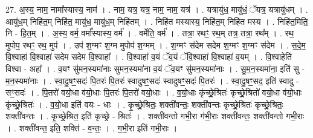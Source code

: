 \documentclass[17pt]{extarticle}
\begin{document}
27. अ॒स्य॒ नाम॒ नामा᳚स्यास्य॒ नाम॑ । . नाम॒ यत्र॒ यत्र॒ नाम॒ नाम॒ यत्र॑ । . यत्रायु॑ध॒ मायु॑धं॒ ॅयत्र॒ यत्रायु॑धम् । . आयु॑ध॒म् निहि॑त॒म् निहि॑त॒ मायु॑ध॒ मायु॑ध॒म् निहि॑तम् । . निहि॑त मस्यास्य॒ निहि॑त॒म् निहि॑त मस्य । . निहि॑त॒मिति॒ नि - हि॒त॒म् । . अ॒स्य॒ वर्म॒ वर्मा᳚स्यास्य॒ वर्म॑ । . वर्मेति॒ वर्म॑ । . तत्रा॒ रथꣳ॒॒ रथ॒म् तत्र॒ तत्रा॒ रथ᳚म् । . रथ॒ मुपोप॒ रथꣳ॒॒ रथ॒ मुप॑ । . उप॑ श॒ग्मꣳ श॒ग्म मुपोप॑ श॒ग्मम् । . श॒ग्मꣳ स॑देम सदेम श॒ग्मꣳ श॒ग्मꣳ स॑देम । . स॒दे॒म॒ वि॒श्वाहा॑ वि॒श्वाहा॑ सदेम सदेम वि॒श्वाहा᳚ । . वि॒श्वाहा॑ व॒यं ॅव॒यं ॅवि॒श्वाहा॑ वि॒श्वाहा॑ व॒यम् । . वि॒श्वाहेति॑ विश्वा - अहा᳚ । . व॒यꣳ सु॑मन॒स्यमा॑नाः सुमन॒स्यमा॑ना व॒यं ॅव॒यꣳ सु॑मन॒स्यमा॑नाः । . सु॒म॒न॒स्यमा॑ना॒ इति॑ सु - म॒न॒स्यमा॑नाः । . स्वा॒दु॒षꣳ॒॒सदः॑ पि॒तरः॑ पि॒तरः॑ स्वादुषꣳ॒॒सदः॑ स्वादुषꣳ॒॒सदः॑ पि॒तरः॑ । . स्वा॒दु॒षꣳ॒॒सद॒ इति॑ स्वादु - सꣳ॒॒सदः॑ । . पि॒तरो॑ वयो॒धा व॑यो॒धाः पि॒तरः॑ पि॒तरो॑ वयो॒धाः । . व॒यो॒धाः कृ॑च्छ्रे॒श्रितः॑ कृच्छ्रे॒श्रितो॑ वयो॒धा व॑यो॒धाः कृ॑च्छ्रे॒श्रितः॑ । . व॒यो॒धा इति॑ वयः - धाः । . कृ॒च्छ्रे॒श्रितः॒ शक्ती॑वन्तः॒ शक्ती॑वन्तः कृच्छ्रे॒श्रितः॑ कृच्छ्रे॒श्रितः॒ शक्ती॑वन्तः । . कृ॒च्छ्रे॒श्रित॒ इति॑ कृच्छ्रे - श्रितः॑ । . शक्ती॑वन्तो गभी॒रा ग॑भी॒राः शक्ती॑वन्तः॒ शक्ती॑वन्तो गभी॒राः । . शक्ती॑वन्त॒ इति॒ शक्ति॑ - व॒न्तः॒ । . ग॒भी॒रा इति॑ गभी॒राः । \newline
\end{document}
